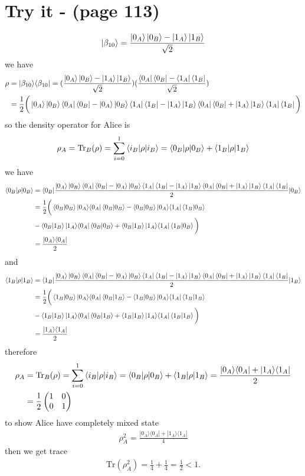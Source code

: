 \documentclass{article}
\newcommand{\op}[2]{|#1\rangle \langle#2|}
\newcommand{\sand}[3]{\braket{#1 | #2 | #3}}
\begin{document}
\section*{Try it - (page 113)}
\begin{align*}
   \ket{\beta_{10}} = \frac{\ket{0_A}\ket{0_B} - \ket{1_A}\ket{1_B}}{\sqrt{2}}
\end{align*}
we have
\begin{align*}
   \rho &= \op{\beta_{10}}{\beta_{10}} = (\frac{\ket{0_A}\ket{0_B} - \ket{1_A}\ket{1_B}}{\sqrt{2}})(\frac{\bra{0_A}\bra{0_B} - \bra{1_A}\bra{1_B}}{\sqrt{2}}) \\
   &= \frac{1}{2}\bigg(\ket{0_A}\ket{0_B}\bra{0_A}\bra{0_B} - \ket{0_A}\ket{0_B}\bra{1_A}\bra{1_B} - \ket{1_A}\ket{1_B}\bra{0_A}\bra{0_B} + \ket{1_A}\ket{1_B}\bra{1_A}\bra{1_B}\bigg)
\end{align*}
so the density operator for Alice is
\begin{align*}
   \rho_{A} = \text{Tr}_B(\rho) = \sum_{i=0}^{1} \sand{i_B}{\rho}{i_B} = \sand{0_B}{\rho}{0_B} + \sand{1_B}{\rho}{1_B} 
\end{align*}
we have
\begin{align*}
   \sand{0_B}{\rho}{0_B} &= \sand{0_B}{\frac{\ket{0_A}\ket{0_B}\bra{0_A}\bra{0_B} - \ket{0_A}\ket{0_B}\bra{1_A}\bra{1_B} - \ket{1_A}\ket{1_B}\bra{0_A}\bra{0_B} + \ket{1_A}\ket{1_B}\bra{1_A}\bra{1_B}}{2}}{0_B} \\
   &= \frac{1}{2}\bigg(\braket{0_B|0_B}\op{0_A}{0_A}\braket{0_B|0_B} - \braket{0_B|0_B}\op{0_A}{1_A}\braket{1_B|0_B} \\
   &- \braket{0_B|1_B}\op{1_A}{0_A}\braket{0_B|0_B} + \braket{0_B|1_B}\op{1_A}{1_A}\braket{1_B|0_B}\bigg) \\
   &= \frac{\op{0_A}{0_A}}{2}
\end{align*}
and
\begin{align*}
   \sand{1_B}{\rho}{1_B} &= \sand{1_B}{\frac{\ket{0_A}\ket{0_B}\bra{0_A}\bra{0_B} - \ket{0_A}\ket{0_B}\bra{1_A}\bra{1_B} - \ket{1_A}\ket{1_B}\bra{0_A}\bra{0_B} + \ket{1_A}\ket{1_B}\bra{1_A}\bra{1_B}}{2}}{1_B} \\
   &= \frac{1}{2}\bigg(\braket{1_B|0_B}\op{0_A}{0_A}\braket{0_B|1_B} - \braket{1_B|0_B}\op{0_A}{1_A}\braket{1_B|1_B} \\
   &- \braket{1_B|1_B}\op{1_A}{0_A}\braket{0_B|1_B} + \braket{1_B|1_B}\op{1_A}{1_A}\braket{1_B|1_B}\bigg) \\
   &= \frac{\op{1_A}{1_A}}{2}
\end{align*}
therefore
\begin{align*}
   \rho_{A} &= \text{Tr}_B(\rho) = \sum_{i=0}^{1} \sand{i_B}{\rho}{i_B} = \sand{0_B}{\rho}{0_B} + \sand{1_B}{\rho}{1_B} = \frac{\op{0_A}{0_A}+\op{1_A}{1_A}}{2} \\
   &= \frac{1}{2}\begin{pmatrix}1&0\\0&1\end{pmatrix}
\end{align*}
to show Alice have completely mixed state
\begin{align*}
   \rho_{A}^2 = \frac{\op{0_A}{0_A}+\op{1_A}{1_A}}{4}
\end{align*}
then we get trace
\begin{align*}
   \text{Tr}(\rho_{A}^2)= \frac{1}{4} + \frac{1}{4} = \frac{1}{2} < 1.
\end{align*}
\end{document}
